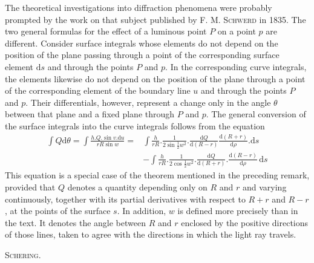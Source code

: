 The theoretical investigations into diffraction phenomena were probably prompted by the work on that subject published by \textsc{F. M. Schwerd} in 1835. The two general formulas for the effect of a luminous point $P$ on a point $p$ are different. Consider surface integrals whose elements do not depend on the position of the plane passing through a point of the corresponding surface element $\mathrm ds$ and through the points $P$ and $p$. In the corresponding curve integrals, the elements likewise do not depend on the position of the plane through a point of the corresponding element of the boundary line $u$ and through the points $P$ and $p$. Their differentials, however, represent a change only in the angle $\theta$ between that plane and a fixed plane through $P$ and $p$. The general conversion of the surface integrals into the curve integrals follows from the equation
\[
\begin{aligned}
\int Q\mathrm d\theta=\int\frac{h.Q.\sin v.\mathrm du}{rR\sin w}
={}&\int\frac h{rR}.\frac1{2\sin\frac12w^2}.\frac{\mathrm dQ}{\mathrm d(R-r)}\frac{\mathrm d(R+r)}{\mathrm d\rho}.\mathrm ds\\
&-\int\frac h{rR}.\frac1{2\cos\frac12w^2}.\frac{\mathrm dQ}{\mathrm d(R+r)}.\frac{\mathrm d(R-r)}{\mathrm d\rho}\,\mathrm ds
\end{aligned}
\]
This equation is a special case of the theorem mentioned in the preceding remark, provided that $Q$ denotes a quantity depending only on $R$ and $r$ and varying continuously, together with its partial derivatives with respect to $R+r$ and $R-r$, at the points of the surface $s$. In addition, $w$ is defined more precisely than in the text. It denotes the angle between $R$ and $r$ enclosed by the positive directions of those lines, taken to agree with the directions in which the light ray travels.

\begin{flushright}\textsc{Schering.}\end{flushright}

\par\nopagebreak[4]\medskip\noindent\makebox[\linewidth][c]{\rule{.20\linewidth}{.35pt}}\par
\clearpage
